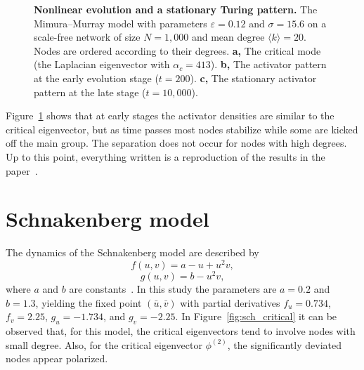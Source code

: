 \begin{figure}[H]
  \caption{\textbf{Nonlinear evolution and a stationary Turing pattern.} The Mimura–Murray model with parameters \(\varepsilon=0.12\) and \(\sigma=15.6\) on a scale-free
network of size \(N=1{,}000\) and mean degree \(\langle k\rangle=20\). Nodes are ordered according to their degrees. \textbf{a,} The critical mode (the Laplacian eigenvector with
\(\alpha_c = 413\)). \textbf{b,} The activator pattern at the early evolution stage (\(t=200\)). \textbf{c,} The stationary activator pattern at the late stage (\(t=10{,}000\)).}
  \label{fig:mimura_evolution}
\end{figure}

Figure~\ref{fig:mimura_evolution} shows that at early stages the activator densities are similar to the critical eigenvector, but as time passes most nodes stabilize while some are kicked off the main group. The separation does not occur for nodes with high degrees. Up to this point, everything written is a reproduction of the results in the paper~\cite{paper}.

\section{Schnakenberg model}
The dynamics of the Schnakenberg model are described by
\begin{equation}
    f(u,v) = a - u + u^2 v,
\end{equation}
\begin{equation}
    g(u, v) = b - u^2 v,
\end{equation}
where \(a\) and \(b\) are constants~\cite{website}. In this study the parameters are \(a=0.2\) and \(b=1.3\), yielding the fixed point \((\bar{u}, \bar{v})\) with partial derivatives \(f_u=0.734\), \(f_v=2.25\), \(g_u=-1.734\), and \(g_v=-2.25\). In Figure~\ref{fig:sch_critical} it can be observed that, for this model, the critical eigenvectors tend to involve nodes with small degree. Also, for the critical eigenvector \(\phi^{(2)}\), the significantly deviated nodes appear polarized.

